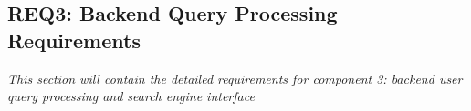 \subsection{REQ3: Backend Query Processing Requirements}

\textit{This section will contain the detailed requirements for component 3: backend user query processing and search engine interface}

